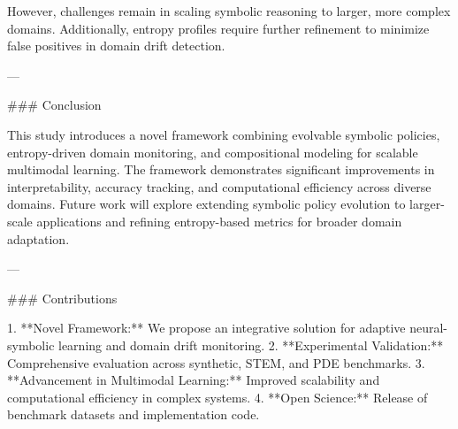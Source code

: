However, challenges remain in scaling symbolic reasoning to larger, more complex domains. Additionally, entropy profiles require further refinement to minimize false positives in domain drift detection.

---

### Conclusion

This study introduces a novel framework combining evolvable symbolic policies, entropy-driven domain monitoring, and compositional modeling for scalable multimodal learning. The framework demonstrates significant improvements in interpretability, accuracy tracking, and computational efficiency across diverse domains. Future work will explore extending symbolic policy evolution to larger-scale applications and refining entropy-based metrics for broader domain adaptation.

---

### Contributions

1. **Novel Framework:** We propose an integrative solution for adaptive neural-symbolic learning and domain drift monitoring.
2. **Experimental Validation:** Comprehensive evaluation across synthetic, STEM, and PDE benchmarks.
3. **Advancement in Multimodal Learning:** Improved scalability and computational efficiency in complex systems.
4. **Open Science:** Release of benchmark datasets and implementation code.

